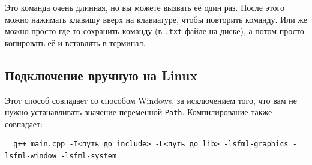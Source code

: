 \documentclass{article}
\begin{document}
Это команда очень длинная, но вы можете вызвать её один раз. После этого можно нажимать клавишу вверх на клавиатуре, чтобы повторить команду. Или же можно просто где-то сохранить команду (в \texttt{.txt} файле на диске), а потом просто копировать её и вставлять в терминал.

\subsection*{Подключение вручную на Linux}
Этот способ совпадает со способом Windows, за исключением того, что вам не нужно устанавливать значение переменной \texttt{Path}. Компилирование также совпадает:
\begin{verbatim}
  g++ main.cpp -I<путь до include> -L<путь до lib> -lsfml-graphics -lsfml-window -lsfml-system
\end{verbatim}
\end{document}
